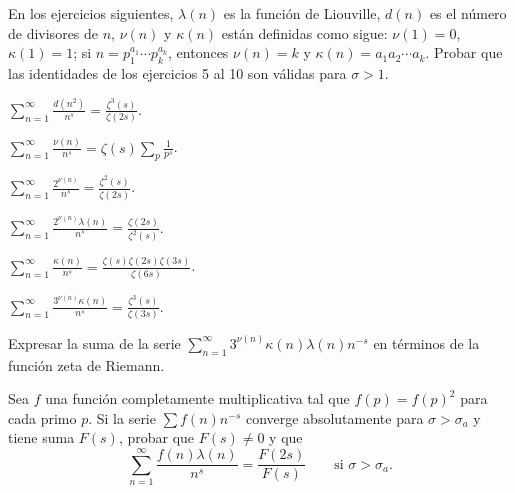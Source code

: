 \documentclass[12pt,a4paper]{book}
\begin{document}
    En los ejercicios siguientes, $\lambda(n)$ es la función de Liouville, $d(n)$ es el número
    de divisores de $n$, $\nu(n)$ y $\kappa(n)$ están definidas como sigue: $\nu(1)=0$,
    $\kappa(1)=1$; si $n=p_{1}^{a_{1}}\cdots p_{k}^{a_{k}}$, entonces $\nu(n)=k$ y
    $\kappa(n)=a_{1}a_{2}\cdots a_{k}$. Probar que las identidades de los ejercicios 5 al 10 son
    válidas para $\sigma>1$.

    \begin{ejercicio}
        $\displaystyle\sum_{n=1}^{\infty}\frac{d(n^{2})}{n^{s}}=\frac{\zeta^{3}(s)}{\zeta(2s)}$.
    \end{ejercicio}

    \begin{ejercicio}
        $\displaystyle\sum_{n=1}^{\infty}\frac{\nu(n)}{n^{s}}=\zeta(s)\sum_{p}\frac{1}{p^{s}}$.
    \end{ejercicio}

    \begin{ejercicio}
        $\displaystyle\sum_{n=1}^{\infty}\frac{2^{\nu(n)}}{n^{s}}=\frac{\zeta^{2}(s)}{\zeta(2s)}$.
    \end{ejercicio}

    \begin{ejercicio}
        $\displaystyle\sum_{n=1}^{\infty}\frac{2^{\nu(n)}\lambda(n)}{n^{s}}=\frac{\zeta(2s)}{\zeta^{2}(s)}$.
    \end{ejercicio}

    \begin{ejercicio}
        $\displaystyle\sum_{n=1}^{\infty}\frac{\kappa(n)}{n^{s}}=\frac{\zeta(s)\zeta(2s)\zeta(3s)}{\zeta(6s)}$.
    \end{ejercicio}

    \begin{ejercicio}
        $\displaystyle\sum_{n=1}^{\infty}\frac{3^{\nu(n)}\kappa(n)}{n^{s}}=\frac{\zeta^{3}(s)}{\zeta(3s)}$.
    \end{ejercicio}

    \begin{ejercicio}
        Expresar la suma de la serie $\sum_{n=1}^{\infty}3^{\nu(n)}\kappa(n)\lambda(n)n^{-s}$ en
        términos de la función zeta de Riemann.
    \end{ejercicio}

    \begin{ejercicio}
        Sea $f$ una función completamente multiplicativa tal que $f(p)=f(p)^{2}$ para cada
        primo $p$. Si la serie $\sum f(n)n^{-s}$ converge absolutamente para $\sigma>\sigma_{a}$
        y tiene suma $F(s)$, probar que $F(s)\neq0$ y que
        \begin{equation*}
            \sum_{n=1}^{\infty}\frac{f(n)\lambda(n)}{n^{s}}=\frac{F(2s)}{F(s)}\qquad\text{si }\sigma>\sigma_{a}.
        \end{equation*}
    \end{ejercicio}
\end{document}
